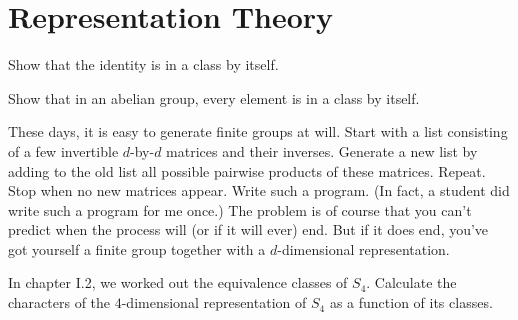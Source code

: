 \documentclass[../group-theory-in-a-nutshell-for-physicists.tex]{subfiles}
\begin{document}
\printanswers

\section{Representation Theory}

\begin{questions}

\question Show that the identity is in a class by itself.

\question Show that in an abelian group, every element is in a class by itself.

\question These days, it is easy to generate finite groups at will. Start with a list consisting of a few invertible $d$-by-$d$ matrices and their inverses. Generate a new list by adding to the old list all possible pairwise products of these matrices. Repeat. Stop when no new matrices appear. Write such a program. (In fact, a student did write such a program for me once.) The problem is of course that you can't predict when the process will (or if it will ever) end. But if it does end, you've got yourself a finite group together with a $d$-dimensional representation.

\question In chapter I.2, we worked out the equivalence classes of $S_4$. Calculate the characters of the $4$-dimensional representation of $S_4$ as a function of its classes.

\end{questions}
\end{document}
